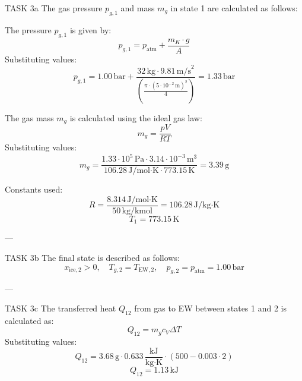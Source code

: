 TASK 3a  
The gas pressure \( p_{g,1} \) and mass \( m_g \) in state 1 are calculated as follows:  

The pressure \( p_{g,1} \) is given by:  
\[
p_{g,1} = p_{\text{atm}} + \frac{m_K \cdot g}{A}
\]  
Substituting values:  
\[
p_{g,1} = 1.00 \, \text{bar} + \frac{32 \, \text{kg} \cdot 9.81 \, \text{m/s}^2}{\left( \frac{\pi \cdot (5 \cdot 10^{-2} \, \text{m})^2}{4} \right)} = 1.33 \, \text{bar}
\]  

The gas mass \( m_g \) is calculated using the ideal gas law:  
\[
m_g = \frac{p V}{R T}
\]  
Substituting values:  
\[
m_g = \frac{1.33 \cdot 10^5 \, \text{Pa} \cdot 3.14 \cdot 10^{-3} \, \text{m}^3}{106.28 \, \text{J/mol·K} \cdot 773.15 \, \text{K}} = 3.39 \, \text{g}
\]  

Constants used:  
\[
R = \frac{8.314 \, \text{J/mol·K}}{50 \, \text{kg/kmol}} = 106.28 \, \text{J/kg·K}
\]  
\[
T_1 = 773.15 \, \text{K}
\]  

---

TASK 3b  
The final state is described as follows:  
\[
x_{\text{ice},2} > 0, \quad T_{g,2} = T_{\text{EW},2}, \quad p_{g,2} = p_{\text{atm}} = 1.00 \, \text{bar}
\]  

---

TASK 3c  
The transferred heat \( Q_{12} \) from gas to EW between states 1 and 2 is calculated as:  
\[
Q_{12} = m_g c_V \Delta T
\]  
Substituting values:  
\[
Q_{12} = 3.68 \, \text{g} \cdot 0.633 \, \frac{\text{kJ}}{\text{kg·K}} \cdot (500 - 0.003 \cdot 2)
\]  
\[
Q_{12} = 1.13 \, \text{kJ}
\]  